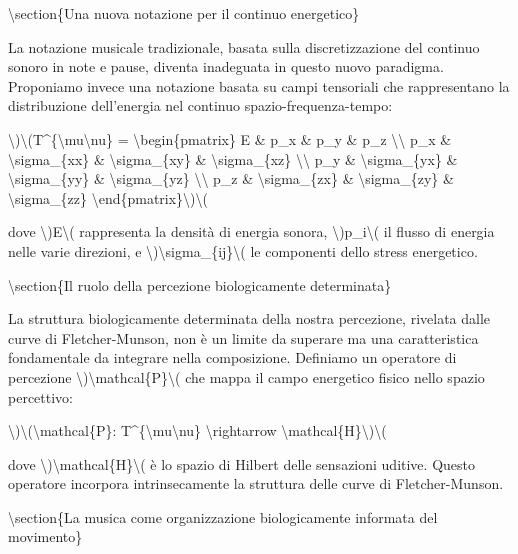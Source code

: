 \documentclass[a4paper,11pt]{article}
\begin{document}
\textbackslash{}section\{Una nuova notazione per il continuo energetico\}

La notazione musicale tradizionale, basata sulla discretizzazione del
continuo sonoro in note e pause, diventa inadeguata in questo nuovo
paradigma. Proponiamo invece una notazione basata su campi tensoriali
che rappresentano la distribuzione dell'energia nel continuo
spazio-frequenza-tempo:

\textbackslash{})\textbackslash{}(T\textasciicircum{}\{\textbackslash{}mu\textbackslash{}nu\} = \textbackslash{}begin\{pmatrix\}
E \& p\_x \& p\_y \& p\_z \textbackslash{}\textbackslash{}
p\_x \& \textbackslash{}sigma\_\{xx\} \& \textbackslash{}sigma\_\{xy\} \& \textbackslash{}sigma\_\{xz\} \textbackslash{}\textbackslash{}
p\_y \& \textbackslash{}sigma\_\{yx\} \& \textbackslash{}sigma\_\{yy\} \& \textbackslash{}sigma\_\{yz\} \textbackslash{}\textbackslash{}
p\_z \& \textbackslash{}sigma\_\{zx\} \& \textbackslash{}sigma\_\{zy\} \& \textbackslash{}sigma\_\{zz\}
\textbackslash{}end\{pmatrix\}\textbackslash{})\textbackslash{}(

dove \textbackslash{})E\textbackslash{}( rappresenta la densit\`a di energia sonora, \textbackslash{})p\_i\textbackslash{}( il flusso di
energia nelle varie direzioni, e \textbackslash{})\textbackslash{}sigma\_\{ij\}\textbackslash{}( le componenti dello
stress energetico.

\textbackslash{}section\{Il ruolo della percezione biologicamente determinata\}

La struttura biologicamente determinata della nostra percezione,
rivelata dalle curve di Fletcher-Munson, non \`e un limite da superare ma
una caratteristica fondamentale da integrare nella composizione.
Definiamo un operatore di percezione \textbackslash{})\textbackslash{}mathcal\{P\}\textbackslash{}( che mappa il campo
energetico fisico nello spazio percettivo:

\textbackslash{})\textbackslash{}(\textbackslash{}mathcal\{P\}: T\textasciicircum{}\{\textbackslash{}mu\textbackslash{}nu\} \textbackslash{}rightarrow \textbackslash{}mathcal\{H\}\textbackslash{})\textbackslash{}(

dove \textbackslash{})\textbackslash{}mathcal\{H\}\textbackslash{}( \`e lo spazio di Hilbert delle sensazioni uditive.
Questo operatore incorpora intrinsecamente la struttura delle curve di
Fletcher-Munson.

\textbackslash{}section\{La musica come organizzazione biologicamente informata del movimento\}
\end{document}
